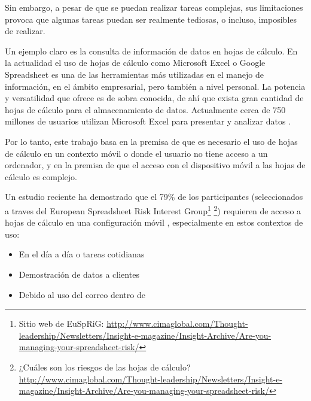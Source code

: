 Sin embargo, a pesar de que se puedan realizar tareas complejas, sus limitaciones provoca que algunas tareas puedan ser realmente tediosas, o incluso, imposibles de realizar.

Un ejemplo claro es la consulta de información de datos en hojas de cálculo. En la actualidad el uso de hojas de cálculo como Microsoft Excel o Google Spreadsheet es una de las herramientas más utilizadas en el manejo de información, en el ámbito empresarial, pero también a nivel personal. La potencia y versatilidad que ofrece es de sobra conocida, de ahí que exista gran cantidad de hojas de cálculo para el almacenamiento de datos. Actualmente cerca de 750 millones de usuarios utilizan Microsoft Excel para presentar y analizar datos \cite{Investitech2015}.

Por lo tanto, este trabajo basa en la premisa de que es necesario el uso de hojas de cálculo en un contexto móvil o donde el usuario no tiene acceso a un ordenador, y en la premisa de que el acceso con el dispositivo móvil a las hojas de cálculo es complejo.

Un estudio reciente ha demostrado que el 79\% de los participantes (seleccionados a traves del European Spreadsheet Risk Interest Group\footnote{Sitio web de EuSpRiG: \url{http://www.cimaglobal.com/Thought-leadership/Newsletters/Insight-e-magazine/Insight-Archive/Are-you-managing-your-spreadsheet-risk/}} \footnote{¿Cuáles son los riesgos de las hojas de cálculo? \url{http://www.cimaglobal.com/Thought-leadership/Newsletters/Insight-e-magazine/Insight-Archive/Are-you-managing-your-spreadsheet-risk/}}) requieren de acceso a hojas de cálculo en una configuración móvil \cite{Flood2011}, especialmente en estos contextos de uso:
\begin{itemize}
	\item En el día a día o tareas cotidianas
	\item Demostración de datos a clientes
	\item Debido al uso del correo dentro de 
\end{itemize}